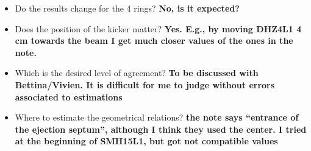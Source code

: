 \documentclass[11pt,letter,english]{article}
\begin{document}
\begin{itemize}
\item{Do the results change for the 4 rings? {\bf No, is it expected?}}
\item{Does the position of the kicker matter? {\bf Yes. E.g., by moving DHZ4L1 4 cm towards the beam I get much closer values of the ones in the note.}}
\item{Which is the desired level of agreement? {\bf To be discussed with Bettina/Vivien. It is difficult for me to judge without errors associated to estimations}}
\item{Where to estimate the geometrical relations? {\bf the note says ``entrance of the ejection septum'', although I think they used the center. I tried at the beginning of SMH15L1, but got not compatible values}}
\end{itemize}
\end{document}

